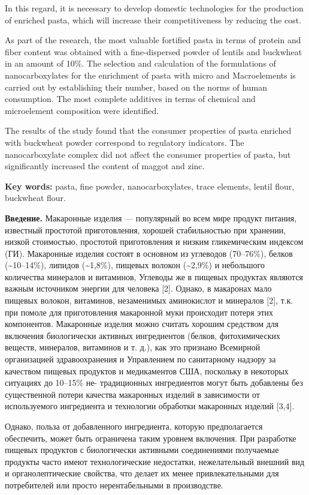 In this regard, it is necessary to develop domestic technologies for the
production of enriched pasta, which will increase their competitiveness
by reducing the cost.

As part of the research, the most valuable fortified pasta in terms of
protein and fiber content was obtained with a fine-dispersed powder of
lentils and buckwheat in an amount of 10\%. The selection and
calculation of the formulations of nanocarboxylates for the enrichment
of pasta with micro and Macroelements is carried out by establishing
their number, based on the norms of human consumption. The most complete
additives in terms of chemical and microelement composition were
identified.

The results of the study found that the consumer properties of pasta
enriched with buckwheat powder correspond to regulatory indicators. The
nanocarboxylate complex did not affect the consumer properties of pasta,
but significantly increased the content of maggot and zinc.

{\bfseries Key words:} pasta, fine powder, nanocarboxylates, trace
elements, lentil flour, buckwheat flour.

{\bfseries Введение.} Макаронные изделия --- популярный во всем мире
продукт питания, известный простотой приготовления, хорошей
стабильностью при хранении, низкой стоимостью, простотой приготовления и
низким гликемическим индексом (ГИ). Макаронные изделия состоят в
основном из углеводов (70--76\%), белков (\textasciitilde10--14\%),
липидов (\textasciitilde1,8\%), пищевых волокон (\textasciitilde2,9\%) и
небольшого количества минералов и витаминов, Углеводы же в пищевых
продуктах являются важным источником энергии для человека {[}2{]}.
Однако, в макаронах мало пищевых волокон, витаминов, незаменимых
аминокислот и минералов {[}2{]}, т.к. при помоле для приготовления
макаронной муки происходит потеря этих компонентов. Макаронные изделия
можно считать хорошим средством для включения биологически активных
ингредиентов (белков, фитохимических веществ, минералов, витаминов и т.
д.), как это признано Всемирной организацией здравоохранения и
Управлением по санитарному надзору за качеством пищевых продуктов и
медикаментов США, поскольку в некоторых ситуациях до 10--15\% не-
традиционных ингредиентов могут быть добавлены без существенной потери
качества макаронных изделий в зависимости от используемого ингредиента и
технологии обработки макаронных изделий {[}3,4{]}.

Однако, польза от добавленного ингредиента, которую предполагается
обеспечить, может быть ограничена таким уровнем включения. При
разработке пищевых продуктов с биологически активными соединениями
получаемые продукты часто имеют технологические недостатки,
нежелательный внешний вид и органолептические свойства, что делает их
менее привлекательными для потребителей или просто нерентабельными в
производстве.

